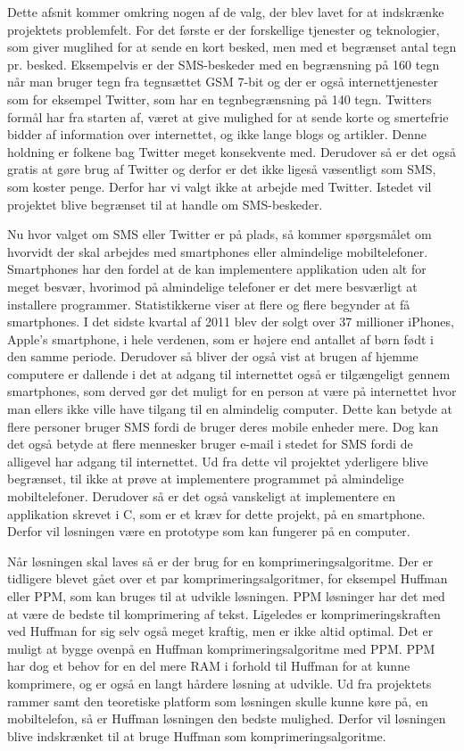 Dette afsnit kommer omkring nogen af de valg, der blev lavet for at indskrænke projektets problemfelt. For det første er der forskellige tjenester og teknologier, som giver muglihed for at sende en kort besked, men med et begrænset antal tegn pr. besked. Eksempelvis er der SMS-beskeder med en begrænsning på 160 tegn når man bruger tegn fra tegnsættet GSM 7-bit\cite{Pro_1} og der er også internettjenester som for eksempel Twitter, som har en tegnbegrænsning på 140 tegn\cite{pro_af1}. Twitters formål har fra starten af, været at give mulighed for at sende korte og smertefrie bidder af information over internettet, og ikke lange blogs og artikler. Denne holdning er folkene bag Twitter meget konsekvente med\cite{pro_af2}. Derudover så er det også gratis at gøre brug af Twitter og derfor er det ikke ligeså væsentligt som SMS, som koster penge. Derfor har vi valgt ikke at arbejde med Twitter. Istedet vil projektet blive begrænset til at handle om SMS-beskeder.

Nu hvor valget om SMS eller Twitter er på plads, så kommer spørgsmålet om hvorvidt der skal arbejdes med smartphones eller almindelige mobiltelefoner. Smartphones har den fordel at de kan implementere applikation uden alt for meget besvær, hvorimod på almindelige telefoner er det mere besværligt at installere programmer. Statistikkerne viser at flere og flere begynder at få smartphones\cite{pro_af3}. I det sidste kvartal af 2011 blev der solgt over 37 millioner iPhones, Apple's smartphone, i hele verdenen, som er højere end antallet af børn født i den samme periode\cite{pro_af4}. Derudover så bliver der også vist at brugen af hjemme computere er dallende i det at adgang til internettet også er tilgængeligt gennem smartphones, som derved gør det muligt for en person at være på internettet hvor man ellers ikke ville have tilgang til en almindelig computer\cite{pro_af3}. Dette kan betyde at flere personer bruger SMS fordi de bruger deres mobile enheder mere. Dog kan det også betyde at flere mennesker bruger e-mail i stedet for SMS fordi de alligevel har adgang til internettet. Ud fra dette vil projektet yderligere blive begrænset, til ikke at prøve at implementere programmet på almindelige mobiltelefoner. Derudover så er det også vanskeligt at implementere en applikation skrevet i C, som er et kræv for dette projekt, på en smartphone. Derfor vil løsningen være en prototype som kan fungerer på en computer. 

Når løsningen skal laves så er der brug for en komprimeringsalgoritme. Der er tidligere blevet gået over et par komprimeringsalgoritmer, for eksempel Huffman eller PPM, som kan bruges til at udvikle løsningen. PPM løsninger har det med at være de bedste til komprimering af tekst. Ligeledes er komprimeringskraften ved Huffman for sig selv også meget kraftig, men er ikke altid optimal. Det er muligt at bygge ovenpå en Huffman komprimeringsalgoritme med PPM. PPM har dog et behov for en del mere RAM i forhold til Huffman for at kunne komprimere, og er også en langt hårdere løsning at udvikle. Ud fra projektets rammer samt den teoretiske platform som løsningen skulle kunne køre på, en mobiltelefon, så er Huffman løsningen den bedste mulighed. Derfor vil løsningen blive indskrænket til at bruge Huffman som komprimeringsalgoritme.\cite{pro_af5}

